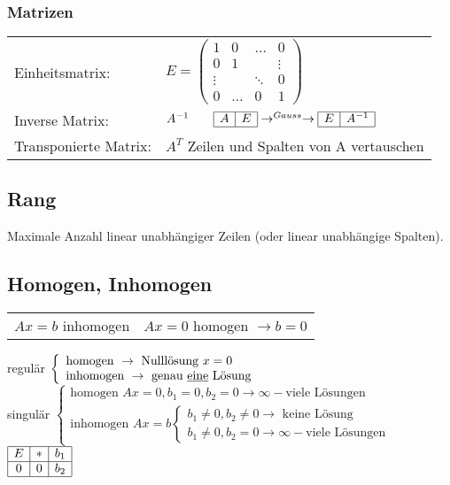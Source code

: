 	\subsubsection{Matrizen}
		\begin{tabular}{ll}
			Einheitsmatrix: & $E = \left(\begin{array}{cccc}
				1 & 0 & \ldots & 0 \\
				0 & 1 &  & \vdots \\
				\vdots &  & \ddots & 0\\
				0 & \ldots & 0 & 1 \end{array}\right)$ \\
			Inverse Matrix: & $A^{-1} \qquad \begin{array}{|c|c|} \hline A & E \\ \hline \end{array} \rightarrow^{Gauss} \rightarrow
					\begin{array}{|c|c|} \hline E & A^{-1} \\ \hline \end{array} $ \\
			Transponierte Matrix: & $A^T$ \qquad Zeilen und Spalten von A vertauschen	
		\end{tabular}

\subsection{Rang}
	Maximale Anzahl linear unabhängiger Zeilen (oder linear unabhängige Spalten).

\subsection{Homogen, Inhomogen}
	\begin{tabular}{ll}
		$Ax = b$ inhomogen & $Ax = 0$ homogen $\rightarrow b=0$\\
	\end{tabular}

	regulär $\left\lbrace\begin{array}{l}
		\text{homogen } \rightarrow \text{ Nulllösung } x=0\\
		\text{inhomogen } \rightarrow \text{ genau \underline{eine} Lösung }\end{array}\right.$ \\
	
	singulär $\left\lbrace\begin{array}{l}
		\text{homogen } Ax=0, b_1=0, b_2=0 \rightarrow \infty-\text{viele Lösungen}\\
		\text{inhomogen } Ax = b \left\lbrace\begin{array}{l}
			b_1 \neq 0, b_2 \neq 0 \rightarrow \text{ keine Lösung}\\
			b_1 \neq 0, b_2 =0 \rightarrow \infty-\text{viele Lösungen} \end{array}\right. \end{array}\right.$ \qquad 
		$ \begin{array}{|c | c|c|}
			\hline E & * & b_1 \\
			\hline 
			0 & 0 & b_2 \\
			\hline \end{array}$ \\

